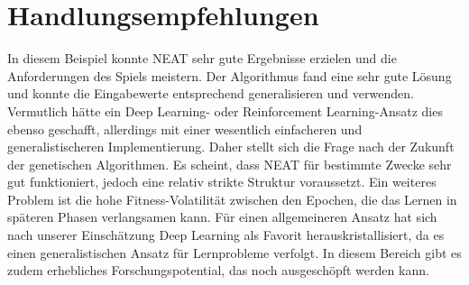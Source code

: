\section{Handlungsempfehlungen}
In diesem Beispiel konnte NEAT sehr gute Ergebnisse erzielen und die Anforderungen des Spiels meistern. Der Algorithmus fand eine sehr gute Lösung und konnte die Eingabewerte entsprechend generalisieren und verwenden. Vermutlich hätte ein Deep Learning- oder Reinforcement Learning-Ansatz dies ebenso geschafft, allerdings mit einer wesentlich einfacheren und generalistischeren Implementierung. Daher stellt sich die Frage nach der Zukunft der genetischen Algorithmen. Es scheint, dass NEAT für bestimmte Zwecke sehr gut funktioniert, jedoch eine relativ strikte Struktur voraussetzt. Ein weiteres Problem ist die hohe Fitness-Volatilität zwischen den Epochen, die das Lernen in späteren Phasen verlangsamen kann. Für einen allgemeineren Ansatz hat sich nach unserer Einschätzung Deep Learning als Favorit herauskristallisiert, da es einen generalistischen Ansatz für Lernprobleme verfolgt. In diesem Bereich gibt es zudem erhebliches Forschungspotential, das noch ausgeschöpft werden kann. 